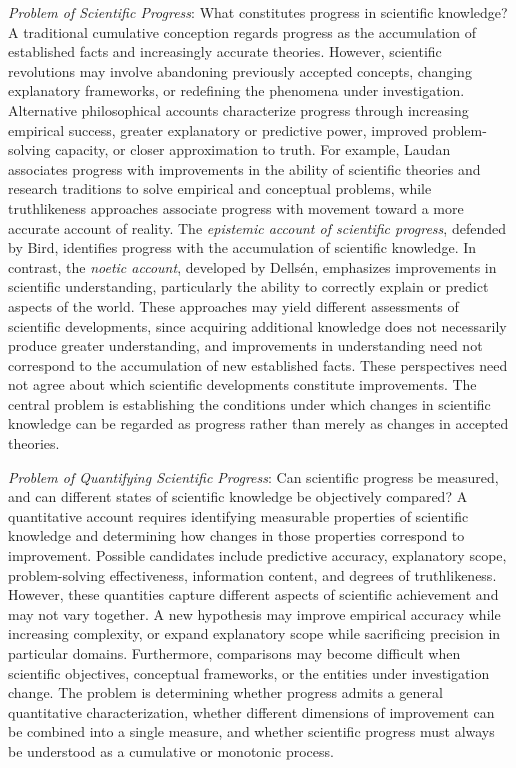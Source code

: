 \emph{Problem of Scientific Progress}: What constitutes progress in scientific knowledge? A traditional cumulative conception regards progress as the accumulation of established facts and increasingly accurate theories. However, scientific revolutions may involve abandoning previously accepted concepts, changing explanatory frameworks, or redefining the phenomena under investigation. Alternative philosophical accounts characterize progress through increasing empirical success, greater explanatory or predictive power, improved problem-solving capacity, or closer approximation to truth. For example, Laudan associates progress with improvements in the ability of scientific theories and research traditions to solve empirical and conceptual problems, while truthlikeness approaches associate progress with movement toward a more accurate account of reality. The \emph{epistemic account of scientific progress}, defended by Bird, identifies progress with the accumulation of scientific knowledge. In contrast, the \emph{noetic account}, developed by Dellsén, emphasizes improvements in scientific understanding, particularly the ability to correctly explain or predict aspects of the world. These approaches may yield different assessments of scientific developments, since acquiring additional knowledge does not necessarily produce greater understanding, and improvements in understanding need not correspond to the accumulation of new established facts. These perspectives need not agree about which scientific developments constitute improvements. The central problem is establishing the conditions under which changes in scientific knowledge can be regarded as progress rather than merely as changes in accepted theories.

\emph{Problem of Quantifying Scientific Progress}: Can scientific progress be measured, and can different states of scientific knowledge be objectively compared? A quantitative account requires identifying measurable properties of scientific knowledge and determining how changes in those properties correspond to improvement. Possible candidates include predictive accuracy, explanatory scope, problem-solving effectiveness, information content, and degrees of truthlikeness. However, these quantities capture different aspects of scientific achievement and may not vary together. A new hypothesis may improve empirical accuracy while increasing complexity, or expand explanatory scope while sacrificing precision in particular domains. Furthermore, comparisons may become difficult when scientific objectives, conceptual frameworks, or the entities under investigation change. The problem is determining whether progress admits a general quantitative characterization, whether different dimensions of improvement can be combined into a single measure, and whether scientific progress must always be understood as a cumulative or monotonic process.

